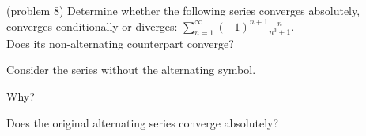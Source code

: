 \documentclass[handout]{ximera}
\begin{document}
\begin{problem}(problem 8)
Determine whether the following series converges absolutely, converges conditionally or diverges: $\displaystyle{\sum_{n=1}^\infty (-1)^{n+1} \frac{n}{n^3 + 1}}$.\\
Does its non-alternating counterpart converge?
\begin{hint} 
Consider the series without the alternating symbol.
\end{hint}
\begin{multipleChoice}
\end{multipleChoice}

Why?
\begin{multipleChoice}
\end{multipleChoice}



Does the original alternating series converge absolutely?
\begin{multipleChoice}
\end{multipleChoice}

\end{problem}
\end{document}
